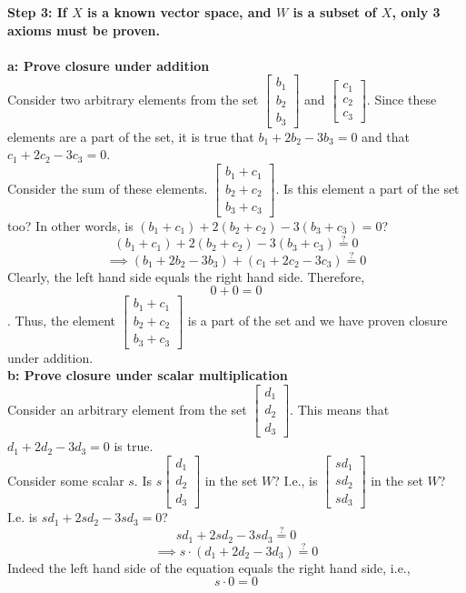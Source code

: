 \begin{enumerate}
{    \textbf{Step 3: If $X$ is a known vector space, and $W$ is a subset of $X$, only 3 axioms must be proven.} \\ \\
    \textbf{a: Prove closure under addition} \\
    Consider two arbitrary elements from the set $\begin{bmatrix} b_1 \\ b_2 \\ b_3 \end{bmatrix}$ and $\begin{bmatrix} c_1 \\ c_2 \\ c_3 \end{bmatrix}$. Since these elements are a part of the set, it is true that $b_1 + 2b_2 - 3b_3 = 0$ and that $c_1 + 2c_2 - 3c_3 = 0$. \\
    Consider the sum of these elements. $\begin{bmatrix} b_1 + c_1 \\ b_2 + c_2 \\ b_3 + c_3 \end{bmatrix}$. Is this element a part of the set too? In other words, is $(b_1+c_1) + 2(b_2+c_2) - 3(b_3 + c_3) = 0$? \\
    $$(b_1+c_1) + 2(b_2+c_2) - 3(b_3 + c_3) \stackrel{?}{=} 0$$
    $$\implies (b_1 + 2b_2 - 3b_3) + (c_1 + 2c_2 - 3c_3) \stackrel{?}{=} 0$$
    Clearly, the left hand side equals the right hand side. Therefore, 
    $$0 + 0 = 0$$.
    Thus, the element $\begin{bmatrix} b_1 + c_1 \\ b_2 + c_2 \\ b_3 + c_3 \end{bmatrix}$ is a part of the set and we have proven closure under addition. \\ 

    \textbf{b: Prove closure under scalar multiplication} \\
    Consider an arbitrary element from the set $\begin{bmatrix} d_1 \\ d_2 \\ d_3 \end{bmatrix}$. This means that $d_1 + 2d_2 - 3d_3 = 0$ is true. \\
    Consider some scalar $s$. Is $s\begin{bmatrix} d_1 \\ d_2 \\ d_3 \end{bmatrix}$ in the set $W$? I.e., is $\begin{bmatrix} sd_1 \\ sd_2 \\ sd_3 \end{bmatrix}$ in the set $W$? I.e. is $sd_1 + 2sd_2 - 3sd_3 = 0$?
    $$sd_1 + 2sd_2 - 3sd_3 \stackrel{?}{=} 0$$
    $$\implies s \cdot (d_1 + 2d_2 - 3d_3) \stackrel{?}{=} 0$$
    Indeed the left hand side of the equation equals the right hand side, i.e., $$s\cdot 0 = 0$$

}
\end{enumerate}
